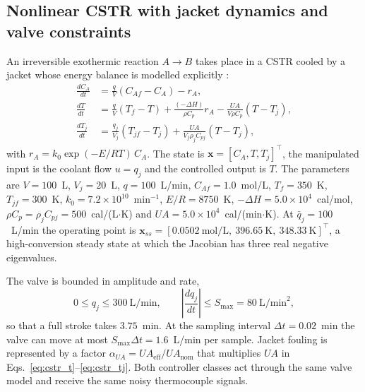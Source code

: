
\subsection{Nonlinear CSTR with jacket dynamics and valve constraints}
\label{subsec:plant}
An irreversible exothermic reaction $A \rightarrow B$ takes place in a CSTR cooled by a jacket whose energy balance is modelled explicitly \cite{uppal1974dynamic, luyben2007chemical, seborg2010process}:
\begin{align}
    \frac{dC_A}{dt} &= \frac{q}{V}(C_{Af} - C_A) - r_A, \label{eq:cstr_ca} \\
    \frac{dT}{dt}   &= \frac{q}{V}(T_f - T) + \frac{(-\Delta H)}{\rho C_p} r_A - \frac{UA}{V \rho C_p}(T - T_j), \label{eq:cstr_t} \\
    \frac{dT_j}{dt} &= \frac{q_j}{V_j}(T_{jf} - T_j) + \frac{UA}{V_j \rho_j C_{pj}}(T - T_j), \label{eq:cstr_tj}
\end{align}
with $r_A = k_0 \exp(-E/RT)\,C_A$. The state is $\mathbf{x} = [C_A, T, T_j]^\top$, the manipulated input is the coolant flow $u = q_j$ and the controlled output is $T$. The parameters are $V = 100$~L, $V_j = 20$~L, $q = 100$~L/min, $C_{Af} = 1.0$~mol/L, $T_f = 350$~K, $T_{jf} = 300$~K, $k_0 = 7.2 \times 10^{10}$~min$^{-1}$, $E/R = 8750$~K, $-\Delta H = 5.0 \times 10^4$~cal/mol, $\rho C_p = \rho_j C_{pj} = 500$~cal/(L$\cdot$K) and $UA = 5.0 \times 10^4$~cal/(min$\cdot$K). At $\bar q_j = 100$~L/min the operating point is $\mathbf{x}_{ss} = [0.0502~\text{mol/L},\ 396.65~\text{K},\ 348.33~\text{K}]^\top$, a high-conversion steady state at which the Jacobian has three real negative eigenvalues.

The valve is bounded in amplitude and rate,
\begin{equation}
    0 \le q_j \le 300~\text{L/min}, \qquad \left|\frac{dq_j}{dt}\right| \le S_{\max} = 80~\text{L/min}^2,
    \label{eq:valve}
\end{equation}
so that a full stroke takes $3.75$~min. At the sampling interval $\Delta t = 0.02$~min the valve can move at most $S_{\max}\Delta t = 1.6$~L/min per sample. Jacket fouling is represented by a factor $\alpha_{UA} = UA_{\text{eff}}/UA_{\text{nom}}$ that multiplies $UA$ in Eqs.~\eqref{eq:cstr_t}--\eqref{eq:cstr_tj}. Both controller classes act through the same valve model and receive the same noisy thermocouple signals.

